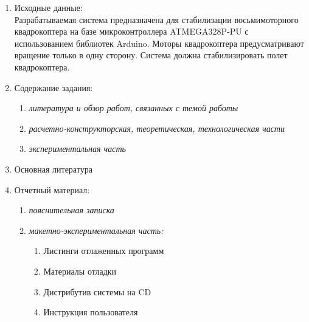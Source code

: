 \begin{enumerate}
	\item Исходные данные:
	\mbox{}\\Разрабатываемая система предназначена для стабилизации восьмимоторного квадрокоптера на базе микроконтроллера ATMEGA328P-PU с использованием библиотек Arduino. Моторы квадрокоптера предусматривают вращение только в одну сторону. Система должна стабилизировать полет квадрокоптера.
	\item Содержание задания:
	\begin{enumerate}
		\item\itshape литература и обзор работ, связанных с темой работы
		\item\itshape расчетно-конструкторская, теоретическая, технологическая части
		\item\itshape экспериментальная часть
	\end{enumerate}
	\item Основная литература
	\item Отчетный материал:
		\begin{enumerate}
		\item{\itshape пояснительная записка}
		\item{\itshape макетно-экспериментальная часть:}
			\begin{enumerate}
			\item Листинги отлаженных программ
			\item Материалы отладки
			\item Дистрибутив системы на CD
			\item Инструкция пользователя
			\end{enumerate}
		\end{enumerate}
\end{enumerate}

\vfill %
